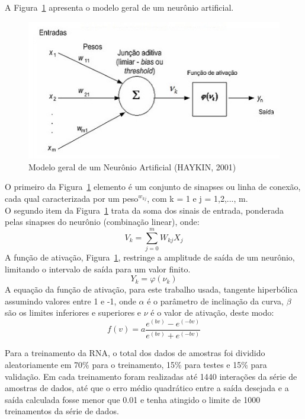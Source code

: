\documentclass[conference]{IEEEtran}
\begin{document}
A Figura~\ref{modelo} apresenta o modelo geral de um neurônio artificial.

\begin{figure}[htbp]
\centerline{\includegraphics[width=0.4\paperwidth]{figuras/modelo.jpg}}
\caption{Modelo geral de um Neurônio Artificial (HAYKIN, 2001)}
\label{modelo}
\end{figure}

O primeiro da Figura~\ref{modelo} elemento é um conjunto de sinapses ou linha de conexão, cada qual caracterizada por um peso$^{w_{kj}}$, com k = 1 e j = 1,2,..., m.\\
O segundo item da Figura~\ref{modelo} trata da soma dos sinais de entrada, ponderada pelas sinapses do neurônio (combinação linear), onde:\\
\[V _{k}=\sum_{j=0}^{m}W_{kj}X_{j}\]
A função de ativação, Figura~\ref{modelo}, restringe a amplitude de saída de um neurônio, limitando o intervalo de saída para um valor finito.
\[Y _{k}=\varphi (\nu _{k})\]
A equação da função de ativação, para este trabalho usada, tangente hiperbólica assumindo valores entre 1 e -1, onde $\alpha$ é o parâmetro de inclinação da curva, $\beta$ são os limites inferiores e superiores e $\nu$   é o valor de ativação, deste modo:
\[f(v)=a \frac{e^{(bv)}-e^{(-bv)}}{e^{(bv)}+e^{(-bv)}}\]





Para a treinamento da RNA, o total dos dados de amostras foi dividido aleatoriamente em 70\% para o treinamento, 15\% para testes e 15\% para validação. Em cada treinamento foram realizadas até 1440 interações da série de amostras de dados, até que o erro médio quadrático entre a saída desejada e a saída calculada fosse menor que 0.01 e tenha atingido o limite de 1000 treinamentos da série de dados.\\
\end{document}
